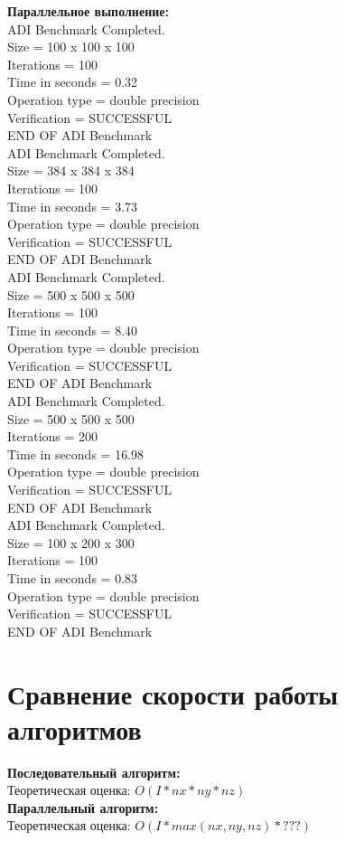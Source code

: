 \documentclass[a4paper,12pt,titlepage,draft]{article}
\begin{document}
\begin{minipage}{.45\textwidth}
\textbf{Параллельное выполнение:}\\

 ADI Benchmark Completed.\\
 Size            =  100 x  100 x  100\\
 Iterations      =                100\\
 Time in seconds =               0.32\\
 Operation type  =   double precision\\
 Verification    =         SUCCESSFUL\\
 END OF ADI Benchmark\\

 ADI Benchmark Completed.\\
 Size            =  384 x  384 x  384\\
 Iterations      =                100\\
 Time in seconds =               3.73\\
 Operation type  =   double precision\\
 Verification    =         SUCCESSFUL\\
 END OF ADI Benchmark\\

 ADI Benchmark Completed.\\
 Size            =  500 x  500 x  500\\
 Iterations      =                100\\
 Time in seconds =               8.40\\
 Operation type  =   double precision\\
 Verification    =         SUCCESSFUL\\
 END OF ADI Benchmark\\

 ADI Benchmark Completed.\\
 Size            =  500 x  500 x  500\\
 Iterations      =                200\\
 Time in seconds =             16.98\\
 Operation type  =   double precision\\
 Verification    =         SUCCESSFUL\\
 END OF ADI Benchmark\\

 ADI Benchmark Completed.\\
 Size            =  100 x  200 x  300\\
 Iterations      =                100\\
 Time in seconds =               0.83\\
 Operation type  =   double precision\\
 Verification    =         SUCCESSFUL\\
 END OF ADI Benchmark
\end{minipage}
\newpage
\section{Сравнение скорости работы алгоритмов}
\textbf{Последовательный алгоритм:}\\

Теоретическая оценка: $O(I * nx * ny * nz)$\\

\textbf{Параллельный алгоритм:}\\

Теоретическая оценка: $O(I * max(nx, ny, nz) * ???)$
\end{document}
